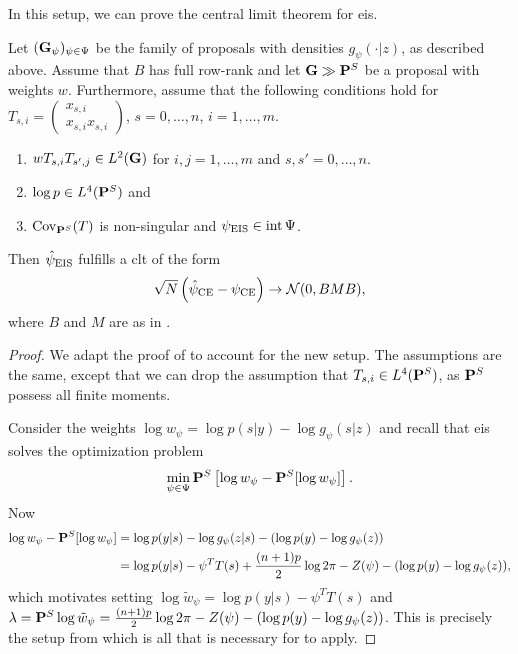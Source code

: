In this setup, we can prove the central limit theorem for \acrshort{eis}.

\begin{theorem}
    \label{thm:eis_clt_ssm}

    Let $(\G_{\psi})_{\psi\in\Psi}$ be the family of proposals with densities $g_{\psi}(\cdot|z)$, as described above. Assume that $B$ has full row-rank and let $\G \gg \P^{S}$ be a proposal with weights $w$. Furthermore, assume that the following conditions hold for $T_{s,i} = \begin{pmatrix}
        x_{s,i} \\
        x_{s,i}x_{s,i}
    \end{pmatrix}$, $s = 0, \dots, n$, $i=1,\dots,m$.

    \begin{enumerate}
        \item $wT_{s,i}T_{s',j} \in L^{2}(\G)$ for $i,j = 1,\dots, m$ and $s,s' = 0, \dots, n$.
        \item $\log p \in L^{4}(\P^{S})$ and
        \item $\cov _{\P^{S}}(T)$ is non-singular and $\peis \in \operatorname{int} \Psi$. 
    \end{enumerate}

    Then $\hpeis$ fulfills a \acrshort{clt} of the form 
    $$
        \sqrt{N} \left( \hpce - \pce \right) \to \mathcal N (0, BMB),
    $$
    where $B$ and $M$ are as in .
\end{theorem}

\begin{proof}
    We adapt the proof of  to account for the new setup. The assumptions are the same, except that we can drop the assumption that $T_{s,i} \in L^{4}(\P^{S})$, as $\P^{S}$ possess all finite moments.

    Consider the weights $\log w_{\psi} = \log p(s|y) - \log g_{\psi}(s|z)$ and recall that \acrshort{eis} solves the optimization problem 
    $$
        \min_{\psi \in \Psi} \P^{S} \left[\log w_{\psi} - \P^{S} [\log w_{\psi} ]\right].
    $$
    Now 
    \begin{align*}
        \log w_{\psi} - \P^{S} [\log w_{\psi}] &= \log p(y|s) - \log g_{\psi}(z|s) - (\log p(y) - \log g_{\psi}(z))\\
        &= \log p(y|s) - \psi^{T}T(s) + \frac{(n+1)p}{2} \log 2\pi - Z(\psi) - (\log p(y) - \log g_{\psi}(z)),
    \end{align*}
    which motivates setting $\log \tilde w_{\psi} = \log p(y|s) - \psi^{T}T(s)$ and $\lambda = \P^{S} \log \tilde w_{\psi} = \frac{(n+1)p}{2} \log 2\pi - Z(\psi) - (\log p(y) - \log g_{\psi}(z))$. 
    This is precisely the setup from  which is all that is necessary for  to apply.
\end{proof}

